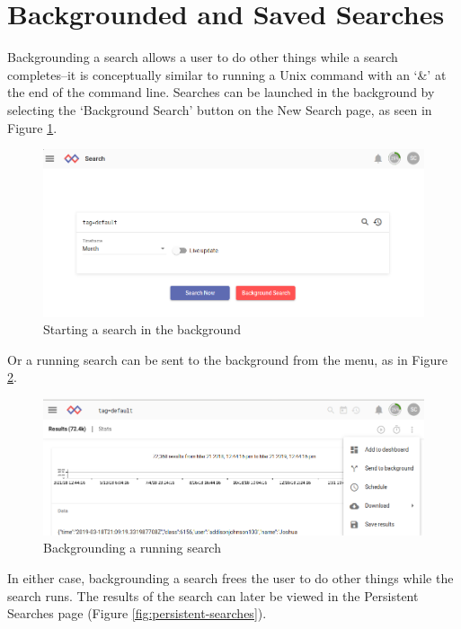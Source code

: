 \section{Backgrounded and Saved Searches}

Backgrounding a search allows a user to do other things while a search
completes--it is conceptually similar to running a Unix command with
an `\&' at the end of the command line. Searches can be launched in the
background by selecting the `Background Search' button on the New Search
page, as seen in Figure \ref{fig:bg-new-search}.


\begin{figure}
	\includegraphics{images/bg-new-search.png}
	\caption{Starting a search in the background}
	\label{fig:bg-new-search}
\end{figure}

Or a running search can be sent to the background from the menu, as in Figure \ref{fig:bg-existing-search}.

\begin{figure}
	\includegraphics{images/bg-existing-search.png}
	\caption{Backgrounding a running search}
	\label{fig:bg-existing-search}
\end{figure}

In either case, backgrounding a search frees the user to do other
things while the search runs. The results of the search can later be
viewed in the Persistent Searches page (Figure \ref{fig:persistent-searches}).

